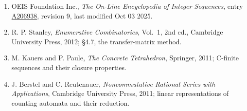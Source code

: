\documentclass[11pt]{article}
\theoremstyle{definition}
\begin{document}
\begin{enumerate}

\item OEIS Foundation Inc., \emph{The On-Line Encyclopedia of Integer Sequences}, entry \href{https://oeis.org/A206938}{A206938}, revision 9, last modified Oct 03 2025.

\item R. P. Stanley, \emph{Enumerative Combinatorics}, Vol.~1, 2nd ed., Cambridge University Press, 2012; \S4.7, the transfer-matrix method.

\item M. Kauers and P. Paule, \emph{The Concrete Tetrahedron}, Springer, 2011; C-finite sequences and their closure properties.

\item J. Berstel and C. Reutenauer, \emph{Noncommutative Rational Series with Applications}, Cambridge University Press, 2011; linear representations of counting automata and their reduction.

\end{enumerate}
\end{document}
